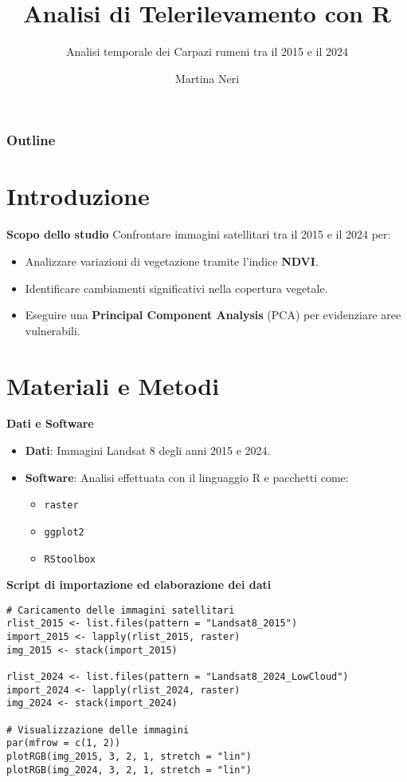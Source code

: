 \documentclass{beamer}
\title{\textbf{Analisi di Telerilevamento con R}}
\subtitle{Analisi temporale dei Carpazi rumeni tra il 2015 e il 2024}
\author{Martina Neri}
\begin{document}
\maketitle

\begin{frame}
\frametitle{Outline}
\tableofcontents
\end{frame}

\section{Introduzione}

\begin{frame}{\textbf{Scopo dello studio}}
Confrontare immagini satellitari tra il 2015 e il 2024 per:
\begin{itemize}
    \item Analizzare variazioni di vegetazione tramite l'indice \textbf{NDVI}.
    \item Identificare cambiamenti significativi nella copertura vegetale.
    \item Eseguire una \textbf{Principal Component Analysis} (PCA) per evidenziare aree vulnerabili.
\end{itemize}
\end{frame}

\section{Materiali e Metodi}

\begin{frame}{\textbf{Dati e Software}}
\begin{itemize}
    \item \textbf{Dati}: Immagini Landsat 8 degli anni 2015 e 2024.
    \item \textbf{Software}: Analisi effettuata con il linguaggio R e pacchetti come:
    \begin{itemize}
        \item \texttt{raster}
        \item \texttt{ggplot2}
        \item \texttt{RStoolbox}
    \end{itemize}
\end{itemize}
\end{frame}

\begin{frame}[fragile]{\textbf{Script di importazione ed elaborazione dei dati}}
\begin{lstlisting}
# Caricamento delle immagini satellitari
rlist_2015 <- list.files(pattern = "Landsat8_2015")
import_2015 <- lapply(rlist_2015, raster)
img_2015 <- stack(import_2015)

rlist_2024 <- list.files(pattern = "Landsat8_2024_LowCloud")
import_2024 <- lapply(rlist_2024, raster)
img_2024 <- stack(import_2024)

# Visualizzazione delle immagini
par(mfrow = c(1, 2))
plotRGB(img_2015, 3, 2, 1, stretch = "lin")
plotRGB(img_2024, 3, 2, 1, stretch = "lin")
\end{lstlisting}
\end{frame}
\end{document}
